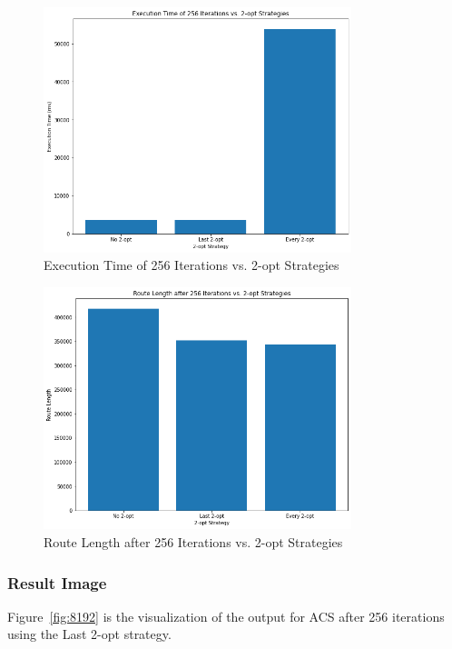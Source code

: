 \documentclass{article}
\begin{document}
\begin{figure}
    \centering
    \includegraphics[width=0.8\textwidth]{2opt_time.png}
    \caption{Execution Time of 256 Iterations vs. 2-opt Strategies}
    \label{fig:2opt_time}
\end{figure}
\begin{figure}
    \centering
    \includegraphics[width=0.8\textwidth]{2opt_result.png}
    \caption{Route Length after 256 Iterations vs. 2-opt Strategies}
    \label{fig:2opt_result}
\end{figure}

\subsubsection{Result Image}
    Figure~\ref{fig:8192} is the visualization of the output for ACS after 256 iterations using the Last 2-opt strategy.
\end{document}
